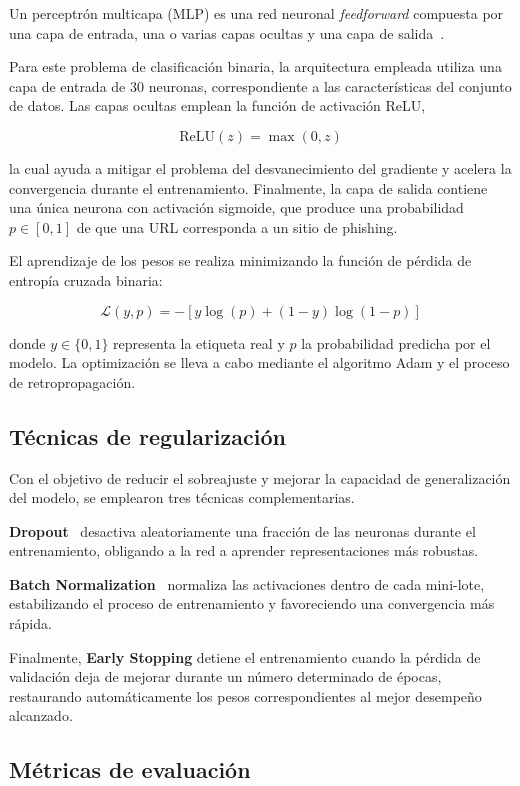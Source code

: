 \documentclass[conference]{IEEEtran}
\begin{document}
Un perceptrón multicapa (MLP) es una red neuronal \textit{feedforward} compuesta por una capa de entrada, una o varias capas ocultas y una capa de salida~\cite{lecun2015}.

Para este problema de clasificación binaria, la arquitectura empleada utiliza una capa de entrada de 30 neuronas, correspondiente a las características del conjunto de datos. Las capas ocultas emplean la función de activación ReLU,

\[
\text{ReLU}(z)=\max(0,z)
\]

la cual ayuda a mitigar el problema del desvanecimiento del gradiente y acelera la convergencia durante el entrenamiento. Finalmente, la capa de salida contiene una única neurona con activación sigmoide, que produce una probabilidad $p \in [0,1]$ de que una URL corresponda a un sitio de phishing.

El aprendizaje de los pesos se realiza minimizando la función de pérdida de entropía cruzada binaria:

\[
\mathcal{L}(y,p)= -[y\log(p)+(1-y)\log(1-p)]
\]

donde $y \in \{0,1\}$ representa la etiqueta real y $p$ la probabilidad predicha por el modelo. La optimización se lleva a cabo mediante el algoritmo Adam y el proceso de retropropagación.

\subsection{Técnicas de regularización}

Con el objetivo de reducir el sobreajuste y mejorar la capacidad de generalización del modelo, se emplearon tres técnicas complementarias.

\textbf{Dropout}~\cite{srivastava2014} desactiva aleatoriamente una fracción de las neuronas durante el entrenamiento, obligando a la red a aprender representaciones más robustas.

\textbf{Batch Normalization}~\cite{ioffe2015} normaliza las activaciones dentro de cada mini-lote, estabilizando el proceso de entrenamiento y favoreciendo una convergencia más rápida.

Finalmente, \textbf{Early Stopping} detiene el entrenamiento cuando la pérdida de validación deja de mejorar durante un número determinado de épocas, restaurando automáticamente los pesos correspondientes al mejor desempeño alcanzado.

\subsection{Métricas de evaluación}
\end{document}
